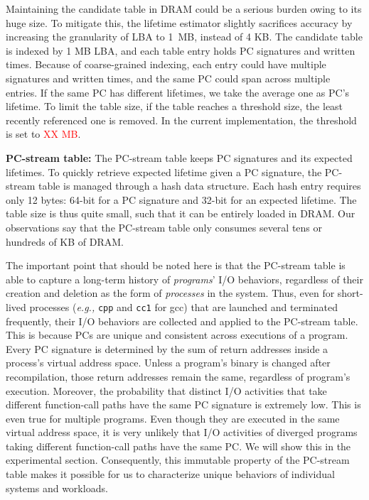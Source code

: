 Maintaining the candidate table in DRAM could be a serious burden owing to its
huge size. To mitigate this, the lifetime estimator slightly sacrifices
accuracy by increasing the granularity of LBA to 1~MB, instead of 4 KB.  The
candidate table is indexed by 1 MB LBA, and each table entry holds PC
signatures and written times. Because of coarse-grained indexing, each entry
could have multiple signatures and written times, and the same PC could span
across multiple entries.  If the same PC has different lifetimes, we take the
average one as PC's lifetime. To limit the table size, if the table reaches a
threshold size, the least recently referenced one is removed. In the current
implementation, the threshold is set to \textcolor{red}{XX MB}.

\textbf{PC-stream table:}
The PC-stream table keeps PC signatures and its expected lifetimes. To quickly
retrieve expected lifetime given a PC signature, the PC-stream table is managed
through a hash data structure. Each hash entry requires only 12 bytes: 64-bit
for a PC signature and 32-bit for an expected lifetime.  The table size is thus
quite small, such that it can be entirely loaded in DRAM. Our observations say
that the PC-stream table only consumes several tens or hundreds of KB of DRAM.

The important point that should be noted here is that the PC-stream table is
able to capture a long-term history of \textit{programs}' I/O behaviors,
regardless of their creation and deletion as the form of \textit{processes} in
the system. Thus, even for short-lived processes (\textit{e.g.,} \texttt{cpp}
and \texttt{cc1} for gcc) that are launched and terminated frequently, their
I/O behaviors are collected and applied to the PC-stream table.  This is
because PCs are unique and consistent across executions of a program.  Every PC
signature is determined by the sum of return addresses inside a process's
virtual address space.  Unless a program's binary is changed after
recompilation, those return addresses remain the same, regardless of program's
execution.  Moreover, the probability that distinct I/O activities that take
different function-call paths have the same PC signature is extremely low. This
is even true for multiple programs. Even though they are executed in the same
virtual address space, it is very unlikely that I/O activities of diverged
programs taking different function-call paths have the same PC.  We will show
this in the experimental section. Consequently, this immutable property of
the PC-stream table makes it possible for us to characterize 
unique behaviors of individual systems and workloads.

